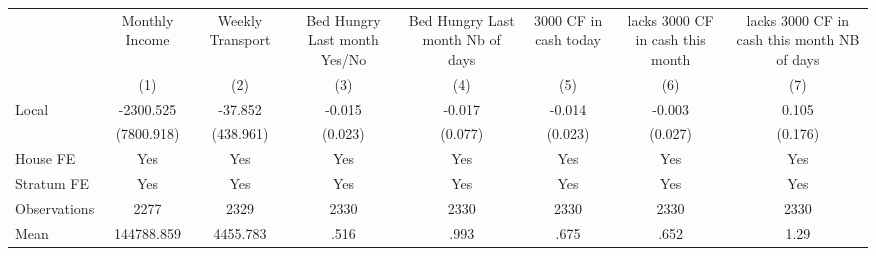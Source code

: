 {
\def\sym#1{\ifmmode^{#1}\else\(^{#1}\)\fi}
\begin{tabular}{l*{7}{c}}
\hline\hline
                &\multicolumn{1}{c}{Monthly Income}&\multicolumn{1}{c}{Weekly Transport}&\multicolumn{1}{c}{Bed Hungry Last month Yes/No}&\multicolumn{1}{c}{Bed Hungry Last month Nb of days}&\multicolumn{1}{c}{3000 CF in cash today}&\multicolumn{1}{c}{lacks 3000 CF in cash this month}&\multicolumn{1}{c}{lacks 3000 CF in cash this month NB of days}\\
                &\multicolumn{1}{c}{(1)}         &\multicolumn{1}{c}{(2)}         &\multicolumn{1}{c}{(3)}         &\multicolumn{1}{c}{(4)}         &\multicolumn{1}{c}{(5)}         &\multicolumn{1}{c}{(6)}         &\multicolumn{1}{c}{(7)}         \\
\hline
Local           &-2300.525         &  -37.852         &   -0.015         &   -0.017         &   -0.014         &   -0.003         &    0.105         \\
                &(7800.918)         &(438.961)         &  (0.023)         &  (0.077)         &  (0.023)         &  (0.027)         &  (0.176)         \\
House FE        &      Yes         &      Yes         &      Yes         &      Yes         &      Yes         &      Yes         &      Yes         \\
Stratum FE      &      Yes         &      Yes         &      Yes         &      Yes         &      Yes         &      Yes         &      Yes         \\
\hline
Observations    &     2277         &     2329         &     2330         &     2330         &     2330         &     2330         &     2330         \\
Mean            &144788.859         & 4455.783         &     .516         &     .993         &     .675         &     .652         &     1.29         \\
\hline\hline
\end{tabular}
}
